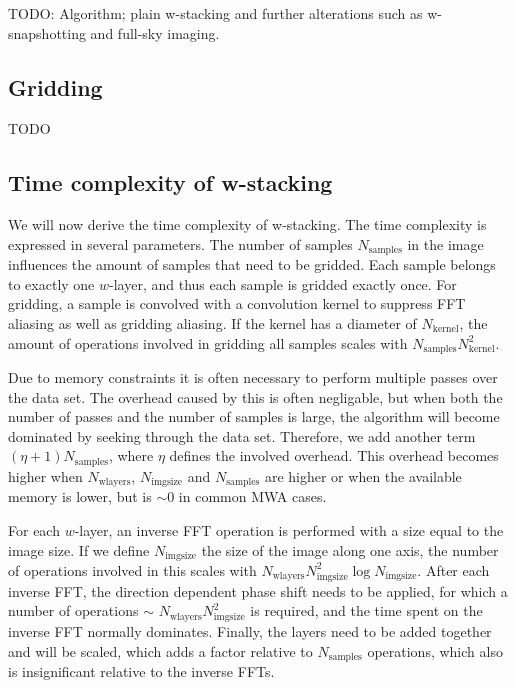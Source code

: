 \documentclass[useAMS,usenatbib]{mn2e}
\begin{document}
TODO: Algorithm; plain w-stacking and further alterations such as w-snapshotting and full-sky imaging.
\subsection{Gridding}
TODO

\subsection{Time complexity of w-stacking}
We will now derive the time complexity of w-stacking. The time complexity is expressed in several parameters. The number of samples $N_\textrm{samples}$ in the image influences the amount of samples that need to be gridded. Each sample belongs to exactly one $w$-layer, and thus each sample is gridded exactly once. For gridding, a sample is convolved with a convolution kernel to suppress FFT aliasing as well as gridding aliasing. If the kernel has a diameter of $N_\textrm{kernel}$, the amount of operations involved in gridding all samples scales with $N_\textrm{samples}N^2_\textrm{kernel}$.

Due to memory constraints it is often necessary to perform multiple passes over the data set. The overhead caused by this is often negligable, but when both the number of passes and the number of samples is large, the algorithm will become dominated by seeking through the data set. Therefore, we add another term $(\eta+1) N_\textrm{samples}$, where $\eta$ defines the involved overhead. This overhead becomes higher when $N_\textrm{wlayers}$, $N_\textrm{imgsize}$ and $N_\textrm{samples}$ are higher or when the available memory is lower, but is $\sim 0$ in common MWA cases.

For each $w$-layer, an inverse FFT operation is performed with a size equal to the image size. If we define $N_\textrm{imgsize}$ the size of the image along one axis, the number of operations involved in this scales with $N_\textrm{wlayers} N^2_\textrm{imgsize} \log N_\textrm{imgsize}$. After each inverse FFT, the direction dependent phase shift needs to be applied, for which a number of operations $\sim$ $N_\textrm{wlayers} N^2_\textrm{imgsize}$ is required, and the time spent on the inverse FFT normally dominates. Finally, the layers need to be added together and will be scaled, which adds a factor relative to $N_\textrm{samples}$ operations, which also is insignificant relative to the inverse FFTs.
\end{document}
